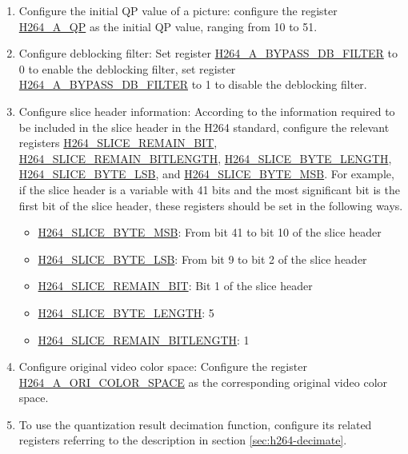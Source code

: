 \documentclass[main\_\_EN.tex]{subfiles}
\begin{document}
\begin{enumerate}
\begin{enumerate}
        \item Configure the initial QP value of a picture: configure the register \hyperref[fielddesc:H264AQP]{H264\_A\_QP} as the initial QP value, ranging from 10 to 51.
        \item Configure deblocking filter: Set register \hyperref[fielddesc:H264ABYPASSDBFILTER]{H264\_A\_BYPASS\_DB\_FILTER} to 0 to enable the deblocking filter, set register \hyperref[fielddesc:H264ABYPASSDBFILTER]{H264\_A\_BYPASS\_DB\_FILTER} to 1 to disable the deblocking filter.
        \item Configure slice header information: According to the information required to be included in the slice header in the H264 standard, configure the relevant registers \hyperref[fielddesc:H264SLICEREMAINBIT]{H264\_SLICE\_REMAIN\_BIT}, \hyperref[fielddesc:H264SLICEREMAINBITLENGTH]{H264\_SLICE\_REMAIN\_BITLENGTH}, \hyperref[fielddesc:H264SLICEBYTELENGTH]{H264\_SLICE\_BYTE\_LENGTH}, \hyperref[fielddesc:H264SLICEBYTELSB]{H264\_SLICE\_BYTE\_LSB}, and \hyperref[fielddesc:H264SLICEBYTEMSB]{H264\_SLICE\_BYTE\_MSB}. For example, if the slice header is a variable with 41 bits and the most significant bit is the first bit of the slice header, these registers should be set in the following ways.
            \begin{itemize}
                \item \hyperref[fielddesc:H264SLICEBYTEMSB]{H264\_SLICE\_BYTE\_MSB}: From bit 41 to bit 10 of the slice header
                \item \hyperref[fielddesc:H264SLICEBYTELSB]{H264\_SLICE\_BYTE\_LSB}: From bit 9 to bit 2 of the slice header
                \item \hyperref[fielddesc:H264SLICEREMAINBIT]{H264\_SLICE\_REMAIN\_BIT}: Bit 1 of the slice header
                \item \hyperref[fielddesc:H264SLICEBYTELENGTH]{H264\_SLICE\_BYTE\_LENGTH}: 5
                \item \hyperref[fielddesc:H264SLICEREMAINBITLENGTH]{H264\_SLICE\_REMAIN\_BITLENGTH}: 1
            \end{itemize}
        \item Configure original video color space: Configure the register \hyperref[fielddesc:H264AORICOLORSPACE]{H264\_A\_ORI\_COLOR\_SPACE} as the corresponding original video color space.
        \item To use the quantization result decimation function, configure its related registers referring to the description in section \ref{sec:h264-decimate}.

\end{enumerate}
\end{enumerate}
\end{document}
